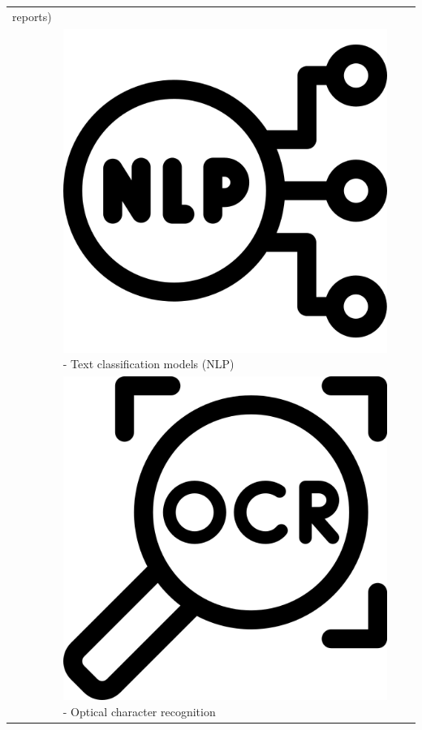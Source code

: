 \documentclass[
  letterpaper,
  DIV=11,
  numbers=noendperiod]{scrreprt}
\begin{document}
\begin{tcolorbox}
\begin{longtable}[]{@{}llll@{}}
reports) & & \\
& \includegraphics{assets/nlp_icon.png} - Text classification models
(NLP) & & \\
& \includegraphics{assets/ocr_icon.png} - Optical character recognition

\end{longtable}
\end{tcolorbox}
\end{document}
